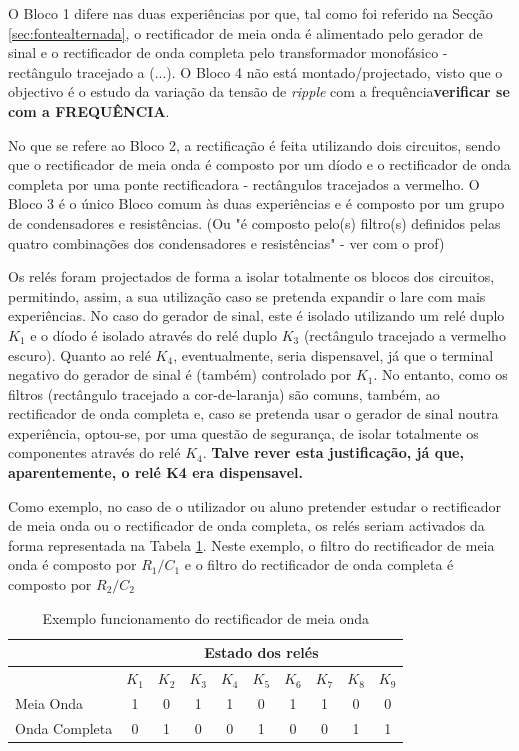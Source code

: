 O Bloco 1 difere nas duas experiências por que, tal como foi referido na Secção \ref{sec:fontealternada}, o rectificador de meia onda é alimentado pelo gerador de sinal e o rectificador de onda completa pelo transformador monofásico - rectângulo tracejado a (...). O Bloco 4 não está montado/projectado, visto que o objectivo é o estudo da variação da tensão de \textit{ripple} com a frequência\. \textbf{verificar se com a FREQUÊNCIA}.

No que se refere ao Bloco 2, a rectificação é feita utilizando dois circuitos, sendo que o rectificador de meia onda é composto por um díodo e o rectificador de onda completa por uma ponte rectificadora - rectângulos tracejados a vermelho. O Bloco 3 é o único Bloco comum às duas experiências e é composto por um grupo de condensadores e resistências. (Ou "é composto pelo(s) filtro(s) definidos pelas quatro combinações dos condensadores e resistências" - ver com o prof)

Os relés foram projectados de forma a isolar totalmente os blocos dos circuitos, permitindo, assim, a sua utilização caso se pretenda expandir o \acrshort{lare} com mais experiências. No caso do gerador de sinal, este é isolado utilizando um relé duplo $K_{1}$ e o díodo é isolado através do relé duplo $K_{3}$ (rectângulo tracejado a vermelho escuro). Quanto ao relé $K_{4}$, eventualmente, seria dispensavel, já que o terminal negativo do gerador de sinal é (também) controlado por $K_{1}$. No entanto, como os filtros (rectângulo tracejado a cor-de-laranja) são comuns,  também, ao rectificador de onda completa e, caso se pretenda usar o gerador de sinal noutra experiência, optou-se, por uma questão de segurança, de isolar totalmente os componentes através do relé $K_{4}$. \textbf{Talve rever esta justificação, já que, aparentemente, o relé K4 era dispensavel.}

Como exemplo, no caso de o utilizador ou aluno pretender estudar o rectificador de meia onda ou o rectificador de onda completa, os relés seriam activados da forma representada na Tabela \ref{Table:exemplomeiaonda}. Neste exemplo, o filtro do rectificador de meia onda é composto por $R_{1}/C_{1}$ e o filtro do rectificador de onda completa é composto por $R_{2}/C_{2}$

\begin{table}[htb]
	\centering
	\caption{Exemplo funcionamento do rectificador de meia onda} 
	
	\label{Table:exemplomeiaonda}
	\begin{tabular}{lccccccccc}
		\toprule
		               & \multicolumn{9}{c}{Estado dos relés} \\
		\midrule
		               & $K_{1}$ & $K_{2}$ & $K_{3}$ & $K_{4}$ & $K_{5}$ & $K_{6}$ & $K_{7}$ & $K_{8}$ & $K_{9}$ \\
		\midrule
		Meia Onda      & 1		 & 0       & 1       & 1       & 0       & 1       & 1       & 0 	   & 0      \\
		\midrule
		Onda Completa  & 0 		 & 1       & 0       & 0       & 1       & 0       & 0       & 1  	   & 1    \\
		\bottomrule
	\end{tabular}
\end{table}

